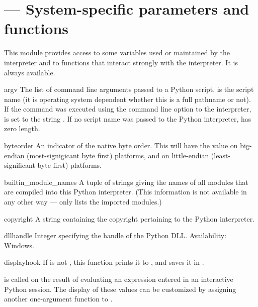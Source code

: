 \section{ ---
         System-specific parameters and functions}


This module provides access to some variables used or maintained by the
interpreter and to functions that interact strongly with the interpreter.
It is always available.


\begin{datadesc}{argv}
  The list of command line arguments passed to a Python script.
   is the script name (it is operating system
  dependent whether this is a full pathname or not).
  If the command was executed using the  command line
  option to the interpreter,  is set to the string
  .
  If no script name was passed to the Python interpreter,
   has zero length.
\end{datadesc}

\begin{datadesc}{byteorder}
  An indicator of the native byte order.  This will have the value
   on big-endian (most-signigicant byte first) platforms,
  and  on little-endian (least-significant byte first)
  platforms.
\end{datadesc}

\begin{datadesc}{builtin_module_names}
  A tuple of strings giving the names of all modules that are compiled
  into this Python interpreter.  (This information is not available in
  any other way ---  only lists the imported
  modules.)
\end{datadesc}

\begin{datadesc}{copyright}
A string containing the copyright pertaining to the Python interpreter.
\end{datadesc}

\begin{datadesc}{dllhandle}
Integer specifying the handle of the Python DLL.
Availability: Windows.
\end{datadesc}

\begin{funcdesc}{displayhook}{}
If  is not , this function prints it to 
, and saves it in .

 is called on the result of evaluating
an expression entered in an interactive Python session.
The display of these values can be customized by assigning
another one-argument function to .
\end{funcdesc}

